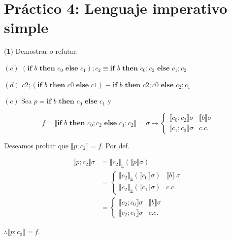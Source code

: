 \documentclass[article, 12pt]{article}
\begin{document}
\pagebreak
\section{Práctico 4: Lenguaje imperativo simple}

\begin{myframe}
(\textbf{1}) Demostrar o refutar.

$(c)$ $(\textbf{if } b \textbf{ then } c_0 \textbf{ else } c_1);c_2 \equiv
\textbf{if } b \textbf{ then } c_0;c_2 \textbf{ else } c_1;c_2$

$(d)$ $c2; (\textbf{if } b \textbf{ then } c0 \textbf{ else } c1) \equiv \textbf{if } b
\textbf{ then } c2; c0 \textbf{ else } c_2; c_1$
\end{myframe}


$(c)$ Sea $p = \textbf{if } b \textbf{ then } c_0 \textbf{ else } c_1$ y

\begin{equation*}
  f = \llbracket \textbf{if } b \textbf{ then } c_0;c_2 \textbf{ else } c_1;c_2
  \rrbracket = \sigma \mapsto \begin{cases}
    \llbracket c_0;c_2 \rrbracket \sigma & \llbracket b \rrbracket \sigma \\ 
    \llbracket c_1;c_2 \rrbracket \sigma & c.c.
  \end{cases}
\end{equation*}

Deseamos probar que $\llbracket p;c_2 \rrbracket = f$. Por def. 

\begin{align*}
  \llbracket p;c_2 \rrbracket \sigma
  &= \llbracket c_2 \rrbracket_{\Bot}\left( \llbracket p \rrbracket \sigma \right) \\ 
  &= \begin{cases}
    \llbracket c_2 \rrbracket_{\Bot} \left(\llbracket c_0 \rrbracket
      \sigma\right) &
    \llbracket b \rrbracket ~ \sigma \\ 
    \llbracket c_2 \rrbracket_{\Bot} \left(\llbracket c_1 \rrbracket
      \sigma\right) & c.c.
  \end{cases} \\ 
  &= \begin{cases}
    \llbracket c_2;c_0 \rrbracket \sigma & \llbracket b \rrbracket \sigma \\ 
    \llbracket c_2;c_1 \rrbracket \sigma & c.c.
  \end{cases}
\end{align*}

$\therefore \llbracket p;c_2 \rrbracket = f$.
\end{document}
